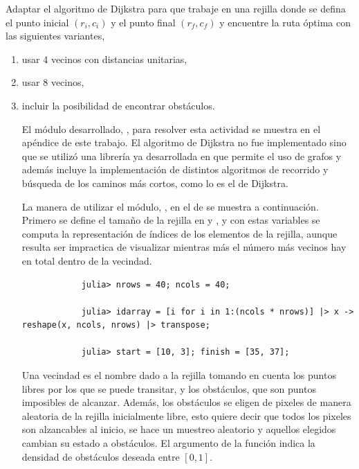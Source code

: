 Adaptar el algoritmo de Dijkstra para que trabaje en una rejilla donde se defina el punto inicial $(r_i, c_i)$ y el punto final $(r_f, c_f)$ y encuentre la ruta óptima con las siguientes variantes,
\begin{enumerate}
    \item usar 4 vecinos con distancias unitarias,
    \item usar 8 vecinos,
    \item incluir la posibilidad de encontrar obstáculos.
    \begin{solution}
        El módulo desarrollado, , para resolver esta actividad se muestra en el apéndice de este trabajo. El algoritmo de Dijkstra no fue implementado sino que se utilizó una librería ya desarrollada en  que permite el uso de grafos y además incluye la implementación de distintos algoritmos de recorrido y búsqueda de los caminos más cortos, como lo es el de Dijkstra.

        La manera de utilizar el módulo, , en el  de  se muestra a continuación. Primero se define el tamaño de la rejilla en  y , y con estas variables se computa la representación de índices de los elementos de la rejilla, aunque resulta ser impractica de visualizar mientras más el número más vecinos hay en total dentro de la vecindad.
        \begin{verbatim}
            julia> nrows = 40; ncols = 40;

            julia> idarray = [i for i in 1:(ncols * nrows)] |> x -> reshape(x, ncols, nrows) |> transpose;

            julia> start = [10, 3]; finish = [35, 37];
        \end{verbatim}

        Una vecindad es el nombre dado a la rejilla tomando en cuenta los puntos libres por los que se puede transitar, y los obstáculos, que son puntos imposibles de alcanzar. Además, los obstáculos se eligen de pixeles de manera aleatoria de la rejilla inicialmente libre, esto quiere decir que todos los pixeles son alzancables al inicio, se hace un muestreo aleatorio y aquellos elegidos cambian su estado a obstáculos. El argumento  de la función  indica la densidad de obstáculos deseada entre $[0, 1]$. 


\end{solution}
\end{enumerate}
